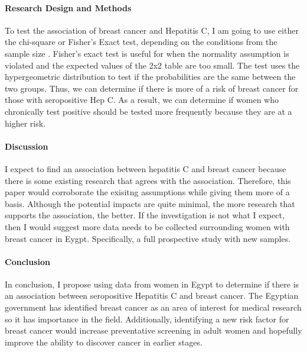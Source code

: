 \documentclass[12pt]{article}
\begin{document}
\paragraph{Research Design and Methods}
To test the association of breast cancer and Hepatitis C, I am going to use either the chi-square or Fisher's Exact test, depending on the
conditions from the sample size \citep{warner2013testing}. Fisher's exact test is useful for when the normality assumption is violated 
and the expected values of the 2x2 table are too small. The test uses the hypergeometric distribution to test if the probabilities are
the same between the two groups. Thus, we can determine if there is more of a risk of breast cancer for those with seropositive Hep C. As
 a result, we can determine if women who chronically test positive should be tested more frequently because they are at a higher risk. 
 
 

\paragraph{Discussion}
I expect to find an association between hepatitis C and breast cancer because there is some existing research that agrees with the association.
Therefore, this paper would corroborate the exisitng assumptions while giving them more of a basis. Although the potential impacts are quite 
minimal, the more research that supports the association, the better. If the investigation is not what I expect, then I would suggest more
data needs to be collected surrounding women with breast cancer in Eygpt. Specifically, a full prospective study with new samples. 

\paragraph{Conclusion}
In conclusion, I propose using data from women in Egypt to determine if there is an association between seropositive Hepatitis C and 
breast cancer. The Egyptian government has identified breast cancer as an area of interest for medical research so it has importance in
the field. Additionally, identifying a new risk factor for breast cancer would increase preventative screening in adult women and hopefully 
improve the ability to discover cancer in earlier stages. 





\end{document}
